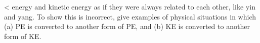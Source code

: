 <%
energy and kinetic energy as if they were always related to
each other, like yin and yang. To show this is incorrect,
give examples of physical situations in which (a) PE is
converted to another form of PE, and (b) KE is converted
to another form of KE.
